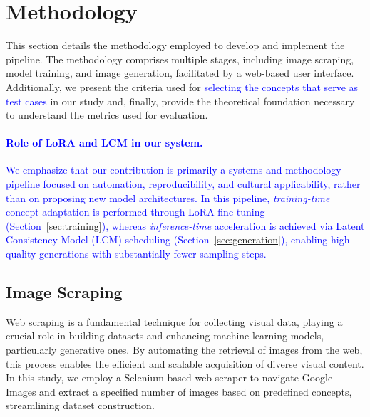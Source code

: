 \documentclass[pdflatex,sn-mathphys-num]{sn-jnl}%
\theoremstyle{thmstyleone}%
\theoremstyle{thmstyletwo}%
\theoremstyle{thmstylethree}%
\begin{document}
\section{Methodology}
\label{methods}

This section details the methodology employed to develop and implement the pipeline. The methodology comprises multiple stages, including image scraping, model training, and image generation, facilitated by a web-based user interface. Additionally, we present the criteria used for \textcolor{blue}{selecting the concepts that serve as test cases} in our study and, finally, provide the theoretical foundation necessary to understand the metrics used for evaluation.

\paragraph*{\textcolor{blue}{Role of LoRA and LCM in our system.}}
\textcolor{blue}{We emphasize that our contribution is primarily a systems and methodology pipeline focused on automation, reproducibility, and cultural applicability, rather than on proposing new model architectures. In this pipeline, \emph{training-time} concept adaptation is performed through LoRA fine-tuning (Section~\ref{sec:training}), whereas \emph{inference-time} acceleration is achieved via Latent Consistency Model (LCM) scheduling (Section~\ref{sec:generation}), enabling high-quality generations with substantially fewer sampling steps.}


\subsection{Image Scraping}

Web scraping is a fundamental technique for collecting visual data, playing a crucial role in building datasets and enhancing machine learning models, particularly generative ones. By automating the retrieval of images from the web, this process enables the efficient and scalable acquisition of diverse visual content. In this study, we employ a Selenium-based web scraper to navigate Google Images and extract a specified number of images based on predefined concepts, streamlining dataset construction.
\end{document}
